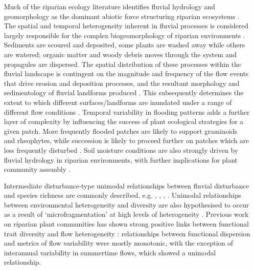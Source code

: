 \documentclass[openright,12pt,a4paper]{memoir}
\begin{document}
Much of the riparian ecology literature identifies fluvial hydrology and geomorphology as the dominant abiotic force structuring riparian ecosystems \citep{Poff1997, Bendix2000}. The spatial and temporal heterogeneity inherent in fluvial processes is considered largely responsible for the complex biogeomorphology of riparian environments \citep{Naiman2005, Corenblit2007}. Sediments are scoured and deposited, some plants are washed away while others are watered; organic matter and woody debris moves through the system and propagules are dispersed. The spatial distribution of these processes within the fluvial landscape is contingent on the magnitude and frequency of the flow events that drive erosion and deposition processes, and the resultant morphology and sedimentology of fluvial landforms produced \citep{fryirs2012geomorphic}. This subsequently determines the extent to which different surfaces/landforms are inundated under a range of different flow conditions \citep{Hughes1997}. Temporal variability in flooding patterns adds a further layer of complexity by influencing the success of plant ecological strategies for a given patch. More frequently flooded patches are likely to support graminoids and rheophytes, while succession is likely to proceed further on patches which are less frequently disturbed \citep{Corenblit2009}. Soil moisture conditions are also strongly driven by fluvial hydrology in riparian environments, with further implications for plant community assembly \citep{Nilsson2002}. 

Intermediate disturbance-type unimodal relationships between fluvial disturbance and species richness are commonly described, e.g. \citet{Bendix1997}, \citet{Bendix2000}, \citet{Lite2005}, \citet{Corenblit2007}. Unimodal relationships between environmental heterogeneity and diversity are also hypothesised to occur as a result of ‘microfragmentation’ at high levels of heterogeneity \citep{Tamme2010}. Previous work on riparian plant communities has shown strong positive links between functional trait diversity and flow heterogeneity \citep{Lawson2015a}: relationships between functional dispersion and metrics of flow variability were mostly monotonic, with the exception of interannual variability in summertime flows, which showed a unimodal relationship.
\end{document}
